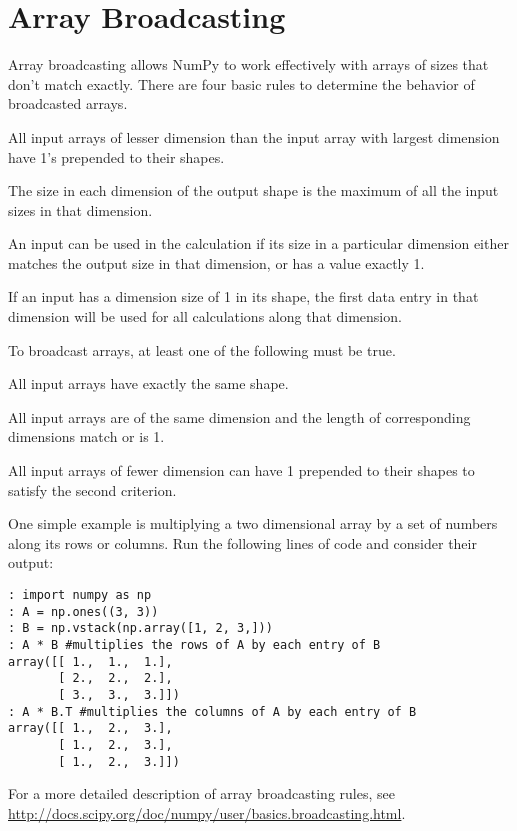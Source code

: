 \section*{Array Broadcasting}
Array broadcasting allows NumPy to work effectively with arrays of sizes that don't match exactly.
There are four basic rules to determine the behavior of broadcasted arrays.
\begin{remunerate}
\item All input arrays of lesser dimension than the input array with largest dimension have 1's prepended to their shapes.
\item The size in each dimension of the output shape is the maximum of all the input sizes in that dimension.
\item An input can be used in the calculation if its size in a particular dimension either matches the output size in that dimension, or has a value exactly 1.
\item If an input has a dimension size of 1 in its shape, the first data entry in that dimension will be used for all calculations along that dimension.
\end{remunerate}
To broadcast arrays, at least one of the following must be true.
\begin{remunerate}
\item All input arrays have exactly the same shape.
\item All input arrays are of the same dimension and the length of corresponding dimensions match or is 1.
\item All input arrays of fewer dimension can have 1 prepended to their shapes to satisfy the second criterion.
\end{remunerate}

One simple example is multiplying a two dimensional array by a set of numbers along its rows or columns.
Run the following lines of code and consider their output:
\begin{lstlisting}
: import numpy as np
: A = np.ones((3, 3))
: B = np.vstack(np.array([1, 2, 3,]))
: A * B #multiplies the rows of A by each entry of B
array([[ 1.,  1.,  1.],
       [ 2.,  2.,  2.],
       [ 3.,  3.,  3.]])
: A * B.T #multiplies the columns of A by each entry of B
array([[ 1.,  2.,  3.],
       [ 1.,  2.,  3.],
       [ 1.,  2.,  3.]])
\end{lstlisting}

For a more detailed description of array broadcasting rules, see \url{http://docs.scipy.org/doc/numpy/user/basics.broadcasting.html}.

